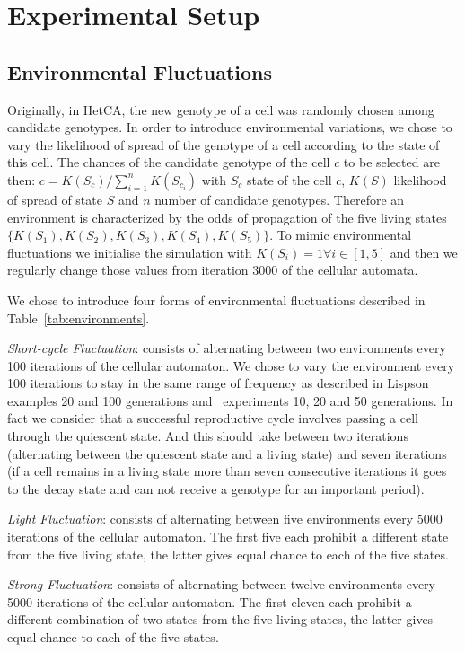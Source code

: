 \documentclass[letterpaper]{article}
\begin{document}
\section{Experimental Setup}\label{sec:exsetup}
\subsection{Environmental Fluctuations}
Originally, in HetCA, the new genotype of a cell was randomly chosen among candidate genotypes. In order to introduce environmental variations, we chose to vary the likelihood of spread of the genotype of a cell according to the state of this cell. The chances of the candidate genotype of the cell $c$ to be selected are then: $c=K(S_c)/\sum_{i=1}^{n} K(S_{c_i})$ with $S_c$ state of the cell $c$, $K(S)$ likelihood of spread of state $S$ and $n$ number of candidate genotypes. Therefore an environment is characterized by the odds of propagation of the five living states $\{K(S_1),K(S_2),K(S_3),K(S_4),K(S_5)\}$.   
To mimic environmental fluctuations we initialise the simulation with $K(S_i)=1  \forall i \in [1,5]$ and then we regularly change those values from iteration 3000 of the cellular automata. 

We chose to introduce four forms of environmental fluctuations described in Table~\ref{tab:environments}.

\noindent \emph{Short-cycle Fluctuation}: consists of alternating between two environments every 100 iterations of the cellular automaton. We chose to vary the environment every 100 iterations to stay in the same range of frequency as described in Lispson~\citep{lipson2002origin} examples 20 and 100 generations and~\citep{yu2007program} experiments 10, 20 and 50 generations. In fact we consider that a successful reproductive cycle involves passing a cell through the quiescent state. And this should take between two iterations (alternating between the quiescent state and a living state) and seven iterations (if a cell remains in a living state more than seven consecutive iterations it goes to the decay state and can not receive a genotype for an important period).

\noindent \emph{Light Fluctuation}: consists of alternating between five environments every 5000 iterations of the cellular automaton. The first five each prohibit a different state from the five living state, the latter gives equal chance to each of the five states.

\noindent \emph{Strong Fluctuation}: consists of alternating between twelve environments every 5000 iterations of the cellular automaton. The first eleven each prohibit a different combination of two states from the five living states, the latter gives equal chance to each of the five states.
\end{document}
